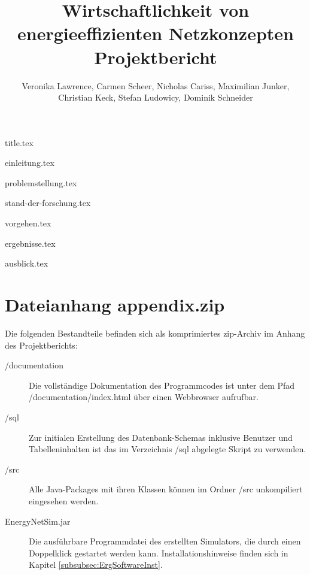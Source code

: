 \documentclass[
  12pt,
  titlepage,
  parskip,
  draft=false,
  headsepline=true,
  footsepline=true,
  captions=tableheading
]{scrartcl}
\title{\huge{Wirtschaftlichkeit von energieeffizienten Netzkonzepten} \\ \large{Projektbericht}}
\author{Veronika Lawrence, Carmen Scheer, Nicholas Cariss, Maximilian Junker,\\ Christian Keck, Stefan Ludowicy, Dominik Schneider}
\begin{document}
	{title.tex}
	
	
	\newpage
	\tableofcontents{}
	\newpage
	\listoffigures
	\listoftables
	\newpage
	
	
	\pagestyle{headings}
	{einleitung.tex}
	
	{problemstellung.tex}
	
	{stand-der-forschung.tex}
	
	{vorgehen.tex}
	
	{ergebnisse.tex}
	
	{ausblick.tex}
	
	\newpage
	\printbibliography[heading=bibintoc]
	
	\newpage
	\appendix
	
	\section{Dateianhang appendix.zip}
	Die folgenden Bestandteile befinden sich als komprimiertes zip-Archiv im Anhang des Projektberichts:
		\begin{description}
			\item[/documentation] Die vollständige Dokumentation des Programmcodes ist unter dem Pfad /documentation/index.html über einen Webbrowser aufrufbar.
			\item[/sql] Zur initialen Erstellung des Datenbank-Schemas inklusive Benutzer und Tabelleninhalten ist das im Verzeichnis /sql abgelegte Skript zu verwenden.
			\item[/src] Alle Java-Packages mit ihren Klassen können im Ordner /src unkompiliert eingesehen werden.
			\item[EnergyNetSim.jar] Die ausführbare Programmdatei des erstellten Simulators, die durch einen Doppelklick gestartet werden kann. Installationshinweise finden sich in Kapitel \ref{subsubsec:ErgSoftwareInst}.
		\end{description}
	
	
\end{document}

